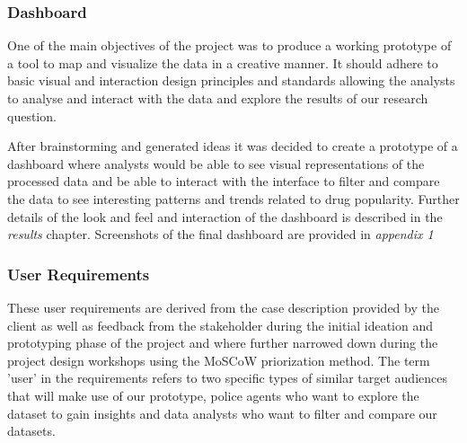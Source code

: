 \subsubsection{Dashboard}

One of the main objectives of the project was to produce a working prototype of a tool to map and visualize the data in a creative manner. It should adhere to basic visual and interaction design principles and standards allowing the analysts to analyse and interact with the data and explore the results of our research question.

After brainstorming and generated ideas it was decided to create a prototype of a dashboard where analysts would be able to see visual representations of the processed data and be able to interact with the interface to filter and compare the data to see interesting patterns and trends related to drug popularity. Further details of the look and feel and interaction of the dashboard is described in the \textit{results} chapter. Screenshots of the final dashboard are provided in \textit{appendix 1}

\subsubsection{User Requirements}

These user requirements are derived from the case description provided by the client as well as feedback from the stakeholder during the initial ideation and prototyping phase of the project and where further narrowed down during the project design workshops using the MoSCoW priorization method. The term 'user' in the requirements refers to two specific types of similar target audiences that will make use of our prototype, police agents who want to explore the dataset to gain insights and data analysts who want to filter and compare our datasets.

